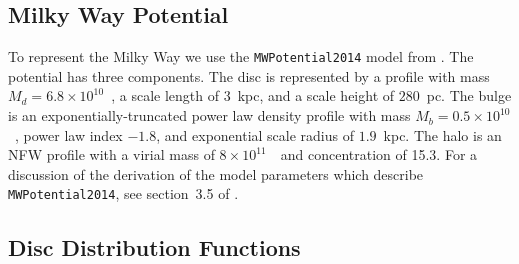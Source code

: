 \subsection{Milky Way Potential}
\label{subsec:MilkWayPotential}

To represent the Milky Way we use the \texttt{MWPotential2014} model from \citet{bovy15}. The potential has three components. The disc is represented by a \citet{miyamoto75} profile with mass $M_{d} = 6.8\times10^{10}$~\Msun, a scale length of $3$~kpc, and a scale height of $280$~pc. The bulge is an exponentially-truncated power law density profile with mass $M_{b} = 0.5\times10^{10}$~\Msun, power law index $-1.8$, and exponential scale radius of $1.9$~kpc. The halo is an NFW \citep{navarro97} profile with a virial mass of $8\times10^{11}$~\Msun\ and concentration of 15.3. For a discussion of the derivation of the model parameters which describe \texttt{MWPotential2014}, see section~3.5 of \citet{bovy15}.

\subsection{Disc Distribution Functions}
\label{subsec:DiscDistributionFunctions}

